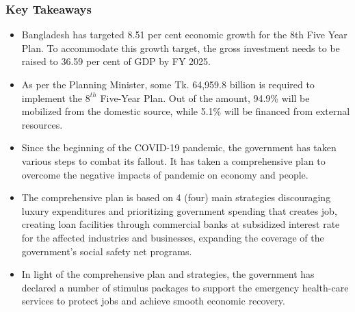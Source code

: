 \subsubsection{Key Takeaways}
\begin{itemize}
	\item Bangladesh has targeted 8.51 per cent economic growth for the 8th Five Year Plan. 
	To accommodate this growth target, the gross investment needs to be raised to 36.59 per cent 
	of GDP by FY 2025.
	
	\item As per the Planning Minister, some Tk. 64,959.8 billion is required to implement 
	the $8^{th}$ Five-Year Plan. Out of the amount, 94.9\% will be mobilized from the domestic source, 
	while 5.1\% will be financed from external resources.
	
	\item Since the beginning of the COVID-19 pandemic, the government has taken various steps to combat its fallout. 
	It has taken a comprehensive plan to overcome the negative impacts of pandemic on economy and people.
	
	\item The comprehensive plan is based on 4 (four) main strategies discouraging luxury expenditures and 
	prioritizing government spending that creates job, creating loan facilities through commercial banks at 
	subsidized interest rate for the affected industries and businesses, expanding the coverage of 
	the government's social safety net programs.
	
	\item In light of the comprehensive plan and strategies, the government has declared 
	a number of stimulus packages to support the emergency health-care services to protect 
	jobs and achieve smooth economic recovery.
\end{itemize}

\newpage
